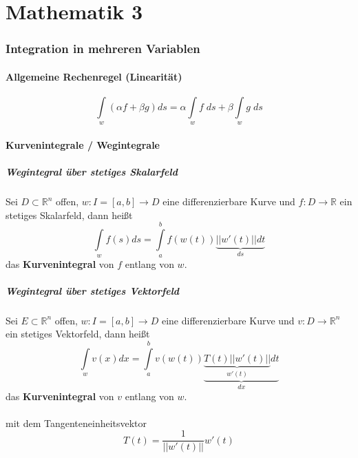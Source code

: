 \documentclass[a4paper,twocolumn,10pt]{article}
\begin{document}
\tableofcontents
\newpage

\part{Mathematik 3}

\section{Integration in mehreren Variablen}

\subsection{Allgemeine Rechenregel (Linearität)}
\begin{equation*}
\int\limits_{w}(\alpha f+\beta g)ds=\alpha\int\limits_{w}f\;ds+\beta\int\limits_{w} g\;ds
\end{equation*}

\subsection{Kurvenintegrale / Wegintegrale}

\subsubsection{Wegintegral über stetiges Skalarfeld}
Sei $D\subset\mathbb{R}^n$ offen, $w:I=[a,b]\rightarrow D$ eine differenzierbare Kurve und $f:D\rightarrow\mathbb{R}$ ein stetiges Skalarfeld, dann heißt
\begin{equation*}
\int\limits_{w}f(s)ds=\int\limits_{a}^{b}f(w(t)) \underbrace{||w'(t)||dt}_{ds}
\end{equation*}
das \textbf{Kurvenintegral} von $f$ entlang von $w$.

\subsubsection{Wegintegral über stetiges Vektorfeld}
Sei $E\subset\mathbb{R}^n$ offen, $w:I=[a,b]\rightarrow D$ eine differenzierbare Kurve und $v:D\rightarrow\mathbb{R}^n$ ein stetiges Vektorfeld, dann heißt
\begin{equation*}
\int\limits_{w}v(x)dx=\int\limits_{a}^{b}v(w(t)) \underbrace{\underbrace{T(t)||w'(t)||}_{w'(t)}dt}_{dx}
\end{equation*}
das \textbf{Kurvenintegral} von $v$ entlang von $w$.\\\\
mit dem Tangenteneinheitsvektor
\begin{equation*}
T(t)=\frac{1}{||w'(t)||}w'(t)
\end{equation*}
\end{document}
